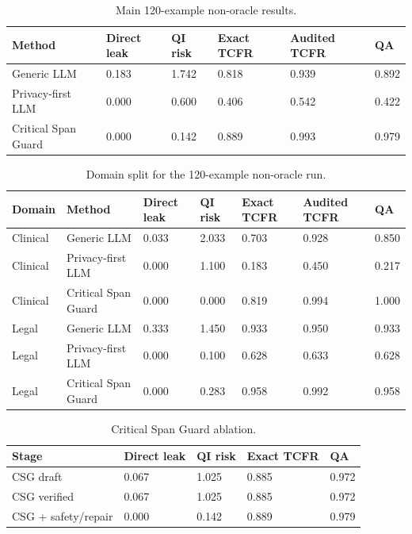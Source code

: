 \begin{table}[t]
\centering
\begin{tabular}{llllll}
\toprule
Method & Direct leak & QI risk & Exact TCFR & Audited TCFR & QA \\
\midrule
Generic LLM & 0.183 & 1.742 & 0.818 & 0.939 & 0.892 \\
Privacy-first LLM & 0.000 & 0.600 & 0.406 & 0.542 & 0.422 \\
Critical Span Guard & 0.000 & 0.142 & 0.889 & 0.993 & 0.979 \\
\bottomrule
\end{tabular}
\caption{Main 120-example non-oracle results.}
\end{table}

\begin{table}[t]
\centering
\begin{tabular}{lllllll}
\toprule
Domain & Method & Direct leak & QI risk & Exact TCFR & Audited TCFR & QA \\
\midrule
Clinical & Generic LLM & 0.033 & 2.033 & 0.703 & 0.928 & 0.850 \\
Clinical & Privacy-first LLM & 0.000 & 1.100 & 0.183 & 0.450 & 0.217 \\
Clinical & Critical Span Guard & 0.000 & 0.000 & 0.819 & 0.994 & 1.000 \\
Legal & Generic LLM & 0.333 & 1.450 & 0.933 & 0.950 & 0.933 \\
Legal & Privacy-first LLM & 0.000 & 0.100 & 0.628 & 0.633 & 0.628 \\
Legal & Critical Span Guard & 0.000 & 0.283 & 0.958 & 0.992 & 0.958 \\
\bottomrule
\end{tabular}
\caption{Domain split for the 120-example non-oracle run.}
\end{table}

\begin{table}[t]
\centering
\begin{tabular}{lllll}
\toprule
Stage & Direct leak & QI risk & Exact TCFR & QA \\
\midrule
CSG draft & 0.067 & 1.025 & 0.885 & 0.972 \\
CSG verified & 0.067 & 1.025 & 0.885 & 0.972 \\
CSG + safety/repair & 0.000 & 0.142 & 0.889 & 0.979 \\
\bottomrule
\end{tabular}
\caption{Critical Span Guard ablation.}
\end{table}

